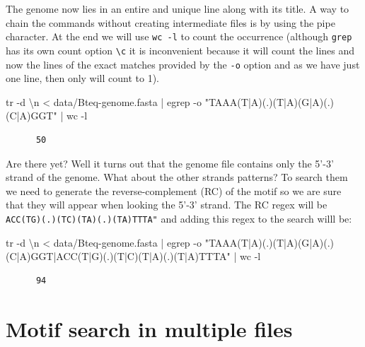 \documentclass[
  letterpaper,
  DIV=11,
  numbers=noendperiod,
  oneside]{scrreprt}
\newenvironment{Shaded}{\begin{snugshade}}{\end{snugshade}}
\newcommand{\AttributeTok}[1]{\textcolor[rgb]{0.40,0.45,0.13}{#1}}
\newcommand{\FunctionTok}[1]{\textcolor[rgb]{0.28,0.35,0.67}{#1}}
\newcommand{\KeywordTok}[1]{\textcolor[rgb]{0.00,0.23,0.31}{#1}}
\newcommand{\NormalTok}[1]{\textcolor[rgb]{0.00,0.23,0.31}{#1}}
\newcommand{\OperatorTok}[1]{\textcolor[rgb]{0.37,0.37,0.37}{#1}}
\newcommand{\StringTok}[1]{\textcolor[rgb]{0.13,0.47,0.30}{#1}}
\begin{document}
The genome now lies in an entire and unique line along with its title. A
way to chain the commands without creating intermediate files is by
using the pipe \texttt{\textbar{}} character. At the end we will use
\texttt{wc\ -l} to count the occurrence (although \texttt{grep} has its
own count option \texttt{\textbackslash{}c} it is inconvenient because
it will count the lines and now the lines of the exact matches provided
by the \texttt{-o} option and as we have just one line, then only will
count to 1).

\begin{Shaded}
\begin{Highlighting}[]
\FunctionTok{tr} \AttributeTok{{-}d} \StringTok{\textquotesingle{}\textbackslash{}n\textquotesingle{}} \OperatorTok{\textless{}}\NormalTok{ data/Bteq{-}genome.fasta }\KeywordTok{|}
    \FunctionTok{egrep} \AttributeTok{{-}o} \StringTok{"TAAA(T|A)(.)(T|A)(G|A)(.)(C|A)GGT"} \KeywordTok{|}
    \FunctionTok{wc} \AttributeTok{{-}l}
\end{Highlighting}
\end{Shaded}

\begin{verbatim}
      50
\end{verbatim}

Are there yet? Well it turns out that the genome file contains only the
5'-3' strand of the genome. What about the other strands patterns? To
search them we need to generate the reverse-complement (RC) of the motif
so we are sure that they will appear when looking the 5'-3' strand. The
RC regex will be
\texttt{ACC(T\textbar{}G)(.)(T\textbar{}C)(T\textbar{}A)(.)(T\textbar{}A)TTTA"}
and adding this regex to the search willl be:

\begin{Shaded}
\begin{Highlighting}[]
\FunctionTok{tr} \AttributeTok{{-}d} \StringTok{\textquotesingle{}\textbackslash{}n\textquotesingle{}} \OperatorTok{\textless{}}\NormalTok{ data/Bteq{-}genome.fasta }\KeywordTok{|}
    \FunctionTok{egrep} \AttributeTok{{-}o} \StringTok{"TAAA(T|A)(.)(T|A)(G|A)(.)(C|A)GGT|ACC(T|G)(.)(T|C)(T|A)(.)(T|A)TTTA"} \KeywordTok{|}
    \FunctionTok{wc} \AttributeTok{{-}l}
\end{Highlighting}
\end{Shaded}

\begin{verbatim}
      94
\end{verbatim}

\hypertarget{motif-search-in-multiple-files}{%
\section*{Motif search in multiple
files}\label{motif-search-in-multiple-files}}
\end{document}
